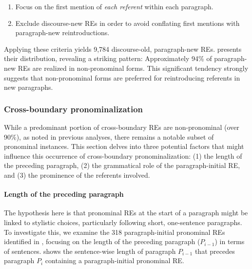 \begin{enumerate}
	\item Focus on the first mention of \emph{each referent} within each paragraph.
	\item Exclude discourse-new REs in order to avoid conflating first mentions with paragraph-new reintroductions.
\end{enumerate}


Applying these criteria yields 9,784 discourse-old, paragraph-new REs.  presents their distribution, revealing a striking pattern: Approximately 94\% of paragraph-new REs are realized in non-pronominal forms. This significant tendency strongly suggests that non-pronominal forms are preferred for reintroducing referents in new paragraphs.




\subsubsection{Cross-boundary pronominalization}\label{subsubsec:acrossboundary_pronoun}

While a predominant portion of cross-boundary REs are non-pronominal (over 90\%), as noted in previous analyses, there remains a notable subset of pronominal instances. This section delves into three potential factors that might influence this occurrence of cross-boundary pronominalization: (1) the length of the preceding paragraph, (2) the grammatical role of the paragraph-initial RE, and (3) the prominence of the referents involved.

\paragraph*{Length of the preceding paragraph}

The hypothesis here is that pronominal REs at the start of a paragraph might be linked to stylistic choices, particularly following short, one-sentence paragraphs. To investigate this, we examine the 318 paragraph-initial pronominal REs identified in , focusing on the length of the preceding paragraph ($P_{i-1}$) in terms of sentences.  shows the sentence-wise length of paragraph $P_{i-1}$ that precedes paragraph $P_{i}$ containing a paragraph-initial pronominal RE.



